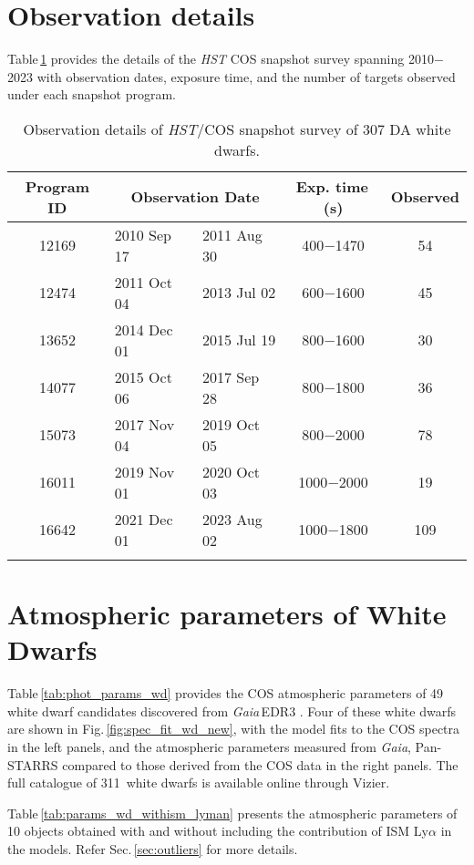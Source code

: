 \documentclass[fleqn,usenatbib, useAMS]{mnras}
\newcommand{\totalnumber}{311}
\begin{document}
\section{Observation details}
Table\,\ref{tab:obs_details} provides the details of the \textit{HST} COS snapshot survey spanning 2010$-$2023 with observation dates, exposure time, and the number of targets observed under each snapshot program.
\begin{table}
\centering
\caption{Observation details of \textit{HST}/COS snapshot survey of 307 DA white dwarfs.}
\addtolength{\tabcolsep}{-4pt}
\begin{tabular}{cl@{~--~}lcc}
\hline
Program ID & \multicolumn{2}{c}{Observation Date}  & Exp. time\,(s) & Observed \\
\hline
12169	&	2010 Sep 17 & 2011 Aug 30	&	400$-$1470 	&	54	\\
12474	&	2011 Oct 04 & 2013 Jul 02	&	600$-$1600	&	45	\\
13652	&	2014 Dec 01 & 2015 Jul 19	&	800$-$1600	&	30	\\
14077	&	2015 Oct 06 & 2017 Sep 28	&	800$-$1800	&	36	\\
15073	&	2017 Nov 04 & 2019 Oct 05	&	800$-$2000	&	78	\\
16011	&	2019 Nov 01 & 2020 Oct 03	&	1000$-$2000	&	19	\\
16642	&	2021 Dec 01 & 2023 Aug 02   &	1000$-$1800	&	109\\
\hline
\label{tab:obs_details}
\end{tabular}
\end{table}

\section{Atmospheric parameters of White Dwarfs}
Table\,\ref{tab:phot_params_wd} provides the COS atmospheric parameters of 49 white dwarf candidates discovered from \textit{Gaia}\,EDR3 \citep{nicola2021}. Four of these white dwarfs are shown in Fig.\,\ref{fig:spec_fit_wd_new}, with the model fits to the COS spectra in the left panels, and the atmospheric parameters measured from \textit{Gaia}, Pan-STARRS compared to those derived from the  COS data in the right panels. The full catalogue of \totalnumber\ white dwarfs is available online through Vizier. 

Table\,\ref{tab:params_wd_withism_lyman} presents the atmospheric parameters of 10 objects obtained with and without including the contribution of ISM Ly$\alpha$ in the models. Refer Sec.\,\ref{sec:outliers} for more details.
\end{document}
